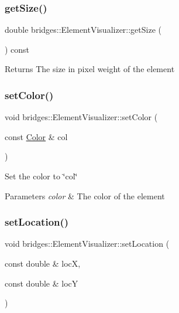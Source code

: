 \subsubsection{\texorpdfstring{get\+Size()}{getSize()}}
{\footnotesize\ttfamily double bridges\+::\+Element\+Visualizer\+::get\+Size (\begin{DoxyParamCaption}{ }\end{DoxyParamCaption}) const\hspace{0.3cm}{\ttfamily [inline]}}

\begin{DoxyReturn}{Returns}
The size in pixel weight of the element 
\end{DoxyReturn}
\mbox{\label{classbridges_1_1_element_visualizer_af14723066e52c159eebfb804d65dd825}} 
\subsubsection{\texorpdfstring{set\+Color()}{setColor()}}
{\footnotesize\ttfamily void bridges\+::\+Element\+Visualizer\+::set\+Color (\begin{DoxyParamCaption}\item[{const \mbox{\hyperlink{classbridges_1_1_color}{Color}} \&}]{col }\end{DoxyParamCaption})\hspace{0.3cm}{\ttfamily [inline]}}

Set the color to \char`\"{}col\char`\"{} 
\begin{DoxyParams}{Parameters}
{\em color} & The color of the element \\
\hline
\end{DoxyParams}
\mbox{\label{classbridges_1_1_element_visualizer_ad06f2fd509f6b3474feeb4fa1fef38d5}} 
\subsubsection{\texorpdfstring{set\+Location()}{setLocation()}}
{\footnotesize\ttfamily void bridges\+::\+Element\+Visualizer\+::set\+Location (\begin{DoxyParamCaption}\item[{const double \&}]{locX,  }\item[{const double \&}]{locY }\end{DoxyParamCaption})\hspace{0.3cm}{\ttfamily [inline]}}

